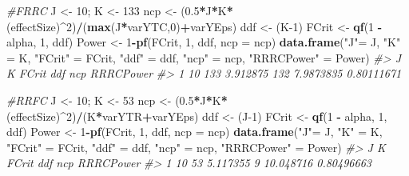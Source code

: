 \documentclass[
]{book}
\newenvironment{Shaded}{\begin{snugshade}}{\end{snugshade}}
\newcommand{\CommentTok}[1]{\textcolor[rgb]{0.56,0.35,0.01}{\textit{#1}}}
\newcommand{\DataTypeTok}[1]{\textcolor[rgb]{0.13,0.29,0.53}{#1}}
\newcommand{\DecValTok}[1]{\textcolor[rgb]{0.00,0.00,0.81}{#1}}
\newcommand{\FloatTok}[1]{\textcolor[rgb]{0.00,0.00,0.81}{#1}}
\newcommand{\KeywordTok}[1]{\textcolor[rgb]{0.13,0.29,0.53}{\textbf{#1}}}
\newcommand{\NormalTok}[1]{#1}
\newcommand{\OperatorTok}[1]{\textcolor[rgb]{0.81,0.36,0.00}{\textbf{#1}}}
\newcommand{\StringTok}[1]{\textcolor[rgb]{0.31,0.60,0.02}{#1}}
\begin{document}
\begin{Shaded}
\begin{Highlighting}[]
\CommentTok{\#FRRC}
\NormalTok{J \textless{}{-}}\StringTok{ }\DecValTok{10}\NormalTok{; K \textless{}{-}}\StringTok{ }\DecValTok{133}
\NormalTok{ncp \textless{}{-}}\StringTok{ }\NormalTok{(}\FloatTok{0.5}\OperatorTok{*}\NormalTok{J}\OperatorTok{*}\NormalTok{K}\OperatorTok{*}\NormalTok{(effectSize)}\OperatorTok{\^{}}\DecValTok{2}\NormalTok{)}\OperatorTok{/}\NormalTok{(}\KeywordTok{max}\NormalTok{(J}\OperatorTok{*}\NormalTok{varYTC,}\DecValTok{0}\NormalTok{)}\OperatorTok{+}\NormalTok{varYEps)}
\NormalTok{ddf \textless{}{-}}\StringTok{ }\NormalTok{(K}\DecValTok{{-}1}\NormalTok{)}
\NormalTok{FCrit \textless{}{-}}\StringTok{ }\KeywordTok{qf}\NormalTok{(}\DecValTok{1} \OperatorTok{{-}}\StringTok{ }\NormalTok{alpha, }\DecValTok{1}\NormalTok{, ddf)}
\NormalTok{Power \textless{}{-}}\StringTok{ }\DecValTok{1}\OperatorTok{{-}}\KeywordTok{pf}\NormalTok{(FCrit, }\DecValTok{1}\NormalTok{, ddf, }\DataTypeTok{ncp =}\NormalTok{ ncp)}
\KeywordTok{data.frame}\NormalTok{(}\StringTok{"J"}\NormalTok{=}\StringTok{ }\NormalTok{J,  }\StringTok{"K"}\NormalTok{ =}\StringTok{ }\NormalTok{K, }\StringTok{"FCrit"}\NormalTok{ =}\StringTok{ }\NormalTok{FCrit, }\StringTok{"ddf"}\NormalTok{ =}\StringTok{ }\NormalTok{ddf, }\StringTok{"ncp"}\NormalTok{ =}\StringTok{ }\NormalTok{ncp, }\StringTok{"RRRCPower"}\NormalTok{ =}\StringTok{ }\NormalTok{Power)}
\CommentTok{\#\textgreater{}    J   K    FCrit ddf       ncp  RRRCPower}
\CommentTok{\#\textgreater{} 1 10 133 3.912875 132 7.9873835 0.80111671}

\CommentTok{\#RRFC}
\NormalTok{J \textless{}{-}}\StringTok{ }\DecValTok{10}\NormalTok{; K \textless{}{-}}\StringTok{ }\DecValTok{53}
\NormalTok{ncp \textless{}{-}}\StringTok{ }\NormalTok{(}\FloatTok{0.5}\OperatorTok{*}\NormalTok{J}\OperatorTok{*}\NormalTok{K}\OperatorTok{*}\NormalTok{(effectSize)}\OperatorTok{\^{}}\DecValTok{2}\NormalTok{)}\OperatorTok{/}\NormalTok{(K}\OperatorTok{*}\NormalTok{varYTR}\OperatorTok{+}\NormalTok{varYEps)}
\NormalTok{ddf \textless{}{-}}\StringTok{ }\NormalTok{(J}\DecValTok{{-}1}\NormalTok{)}
\NormalTok{FCrit \textless{}{-}}\StringTok{ }\KeywordTok{qf}\NormalTok{(}\DecValTok{1} \OperatorTok{{-}}\StringTok{ }\NormalTok{alpha, }\DecValTok{1}\NormalTok{, ddf)}
\NormalTok{Power \textless{}{-}}\StringTok{ }\DecValTok{1}\OperatorTok{{-}}\KeywordTok{pf}\NormalTok{(FCrit, }\DecValTok{1}\NormalTok{, ddf, }\DataTypeTok{ncp =}\NormalTok{ ncp)}
\KeywordTok{data.frame}\NormalTok{(}\StringTok{"J"}\NormalTok{=}\StringTok{ }\NormalTok{J,  }\StringTok{"K"}\NormalTok{ =}\StringTok{ }\NormalTok{K, }\StringTok{"FCrit"}\NormalTok{ =}\StringTok{ }\NormalTok{FCrit, }\StringTok{"ddf"}\NormalTok{ =}\StringTok{ }\NormalTok{ddf, }\StringTok{"ncp"}\NormalTok{ =}\StringTok{ }\NormalTok{ncp, }\StringTok{"RRRCPower"}\NormalTok{ =}\StringTok{ }\NormalTok{Power)}
\CommentTok{\#\textgreater{}    J  K    FCrit ddf       ncp  RRRCPower}
\CommentTok{\#\textgreater{} 1 10 53 5.117355   9 10.048716 0.80496663}
\end{Highlighting}
\end{Shaded}
\end{document}
